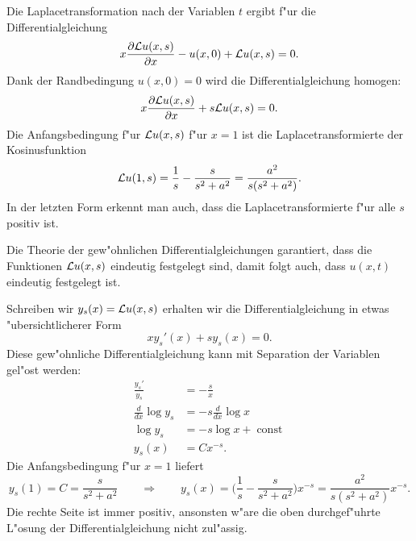 \begin{loesung}
\begin{teilaufgaben}
\item
Die Laplacetransformation nach der Variablen $t$
ergibt f"ur die Differentialgleichung
\[
x\frac{\partial{\cal L}u(x,s)}{\partial x}
-
u(x,0)+{\cal L}u(x,s)=0.
\]
Dank der Randbedingung $u(x,0)=0$ wird die Differentialgleichung
homogen:
\[
x\frac{\partial{\cal L}u(x,s)}{\partial x}
+
s{\cal L}u(x,s)=0.
\]
Die Anfangsbedingung f"ur ${\cal L}u(x,s)$ f"ur $x=1$ ist die
Laplacetransformierte der Kosinusfunktion
\[
{\cal L}u(1,s)=\frac1s-\frac{s}{s^2+a^2} = \frac{a^2}{s(s^2+a^2)}.
\]
In der letzten Form erkennt man auch, dass die Laplacetransformierte
f"ur alle $s$ positiv ist.
\item
Die Theorie der gew"ohnlichen Differentialgleichungen garantiert, dass
die Funktionen ${\cal L}u(x,s)$ eindeutig festgelegt sind, damit folgt
auch, dass $u(x,t)$ eindeutig festgelegt ist.
\item
Schreiben wir $y_s(x)={\cal L}u(x,s)$ erhalten wir die Differentialgleichung
in etwas "ubersichtlicherer Form
\begin{equation}
xy_s'(x)+sy_s(x)=0.
\label{50000008:sdgl}
\end{equation}
Diese gew"ohnliche Differentialgleichung kann mit Separation der
Variablen gel"ost werden:
\begin{align*}
\frac{y_s'}{y_s}&=-\frac{s}{x}
\\
\frac{d}{dx}\log y_s&=-s\frac{d}{dx}\log x
\\
\log y_s&=-s\log x+\operatorname{const}
\\
y_s(x)&=Cx^{-s}.
\end{align*}
Die Anfangsbedingung f"ur $x=1$ liefert
\begin{equation}
y_s(1)=C=\frac{s}{s^2+a^2}
\qquad\Rightarrow\qquad
y_s(x)
=
\biggl(\frac1s-\frac{s}{s^2+a^2}\biggr)x^{-s}
=
\frac{a^2}{s(s^2+a^2)}x^{-s}.
\label{50000008:loesung}
\end{equation}
Die rechte Seite ist immer positiv, ansonsten w"are die oben durchgef"uhrte
L"osung der Differentialgleichung nicht zul"assig.
\qedhere
\end{teilaufgaben}
\end{loesung}

